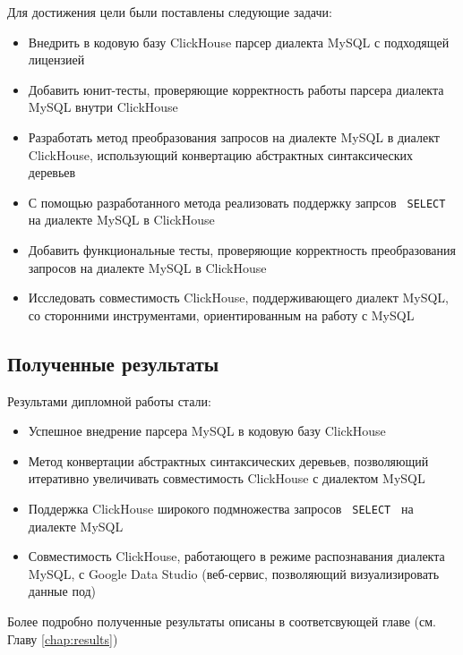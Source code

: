 Для достижения цели были поставлены следующие задачи:
\begin{itemize}
  \item Внедрить в кодовую базу ClickHouse парсер диалекта MySQL с подходящей лицензией
  \item Добавить юнит-тесты, проверяющие корректность работы парсера диалекта MySQL внутри ClickHouse
  \item Разработать метод преобразования запросов на диалекте MySQL в диалект ClickHouse, использующий конвертацию абстрактных синтаксических деревьев
  \item С помощью разработанного метода реализовать поддержку запрсов \texttt{ SELECT } на диалекте MySQL в ClickHouse
  \item Добавить функциональные тесты, проверяющие корректность преобразования запросов на диалекте MySQL в ClickHouse
  \item Исследовать совместимость ClickHouse, поддерживающего диалект MySQL, со сторонними инструментами, ориентированным на работу с MySQL
\end{itemize}

\subsection{Полученные результаты}
Результами дипломной работы стали:

\begin{itemize}
    \item Успешное внедрение парсера MySQL в кодовую базу ClickHouse
    \item Метод конвертации абстрактных синтаксических деревьев, позволяющий итеративно увеличивать совместимость ClickHouse с диалектом MySQL
    \item Поддержка ClickHouse широкого подмножества запросов \texttt{ SELECT } на диалекте MySQL
    \item Совместимость ClickHouse, работающего в режиме распознавания диалекта MySQL, с Google Data Studio (веб-сервис, позволяющий визуализировать данные под)
\end{itemize}

Более подробно полученные результаты описаны в соответсвующей главе (см. Главу \ref{chap:results})

